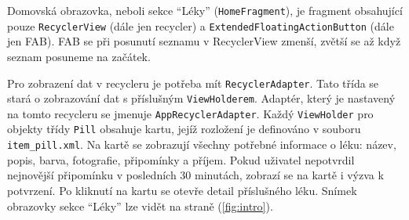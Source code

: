 \documentclass[../TakeYourPill.tex]{subfiles}
\begin{document}
Domovská obrazovka, neboli sekce \enquote{Léky} (\texttt{HomeFragment}), je fragment obsahující pouze \texttt{RecyclerView} (dále jen recycler) a \texttt{ExtendedFloatingActionButton} (dále jen FAB). FAB se při posunutí seznamu v RecyclerView zmenší, zvětší se až když seznam posuneme na začátek. 

Pro zobrazení dat v recycleru je potřeba mít \texttt{RecyclerAdapter}. Tato třída se stará o zobrazování dat s příslušným \texttt{ViewHolderem}. Adaptér, který je nastavený na tomto recycleru se jmenuje \texttt{AppRecyclerAdapter}. Každý \texttt{ViewHolder} pro objekty třídy \texttt{Pill} obsahuje kartu, jejíž rozložení je definováno v souboru \texttt{item\_pill.xml}. Na kartě se zobrazují všechny potřebné informace o léku: název, popis, barva, fotografie, připomínky a příjem. Pokud uživatel nepotvrdil nejnovější připomínku v posledních 30 minutách, zobrazí se na kartě i výzva k potvrzení. Po kliknutí na kartu se otevře detail příslušného léku. Snímek obrazovky sekce \enquote{Léky} lze vidět na straně \pageref{fig:intro} (\ref{fig:intro}).



\end{document}
